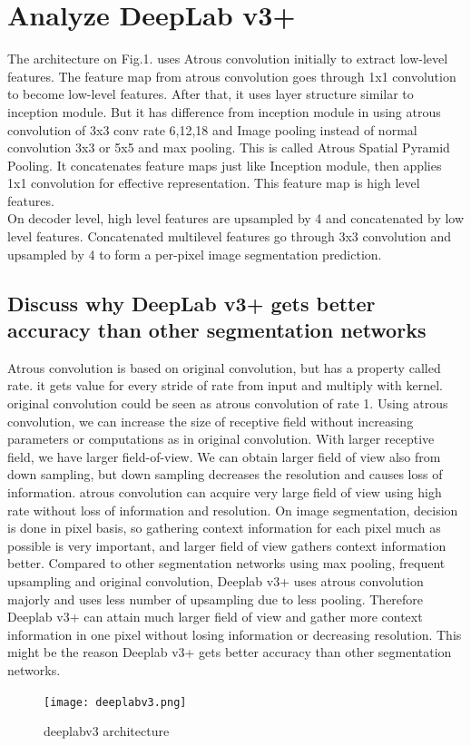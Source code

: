 \documentclass{article}
\begin{document}
\section{Analyze DeepLab v3+}
The architecture on Fig.1. uses Atrous convolution initially to extract low-level features. The feature map from atrous convolution goes through 1x1 convolution to become low-level features. After that, it uses layer structure similar to inception module. But it has difference from inception module in using atrous convolution of 3x3 conv rate 6,12,18 and Image pooling instead of normal convolution 3x3 or 5x5 and max pooling. This is called Atrous Spatial Pyramid Pooling. It concatenates feature maps just like Inception module, then applies 1x1 convolution for effective representation. This feature map is high level features.\\
On decoder level, high level features are upsampled by 4 and concatenated by low level features. Concatenated multilevel features go through 3x3 convolution and upsampled by 4 to form a per-pixel image segmentation prediction.
\subsection{Discuss why DeepLab v3+ gets better accuracy than other segmentation networks}
Atrous convolution is based on original convolution, but has a property called rate. it gets value for every stride of rate from input and multiply with kernel. original convolution could be seen as atrous convolution of rate 1. Using atrous convolution, we can increase the size of receptive field without increasing parameters or computations as in original convolution.  With larger receptive field, we have larger field-of-view. We can obtain larger field of view also from down sampling, but down sampling decreases the resolution and causes loss of information. atrous convolution can acquire very large field of view using high rate without loss of information and resolution. On image segmentation, decision is done in pixel basis, so gathering context information for each pixel much as possible is very important, and larger field of view gathers context information better. Compared to other segmentation networks using max pooling, frequent upsampling and original convolution, Deeplab v3+ uses atrous convolution majorly and uses less number of upsampling due to less pooling. Therefore Deeplab v3+ can attain much larger field of view and gather more context information in one pixel without losing information or decreasing resolution. This might be the reason Deeplab v3+ gets better accuracy than other segmentation networks.\\
\begin{figure}
\texttt{[image: deeplabv3.png]}
\caption{deeplabv3 architecture}
\end{figure}
\end{document}
